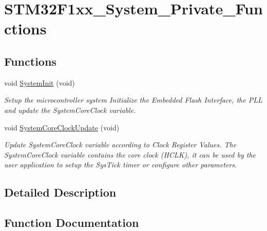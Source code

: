 \hypertarget{group__STM32F1xx__System__Private__Functions}{}\section{S\+T\+M32\+F1xx\+\_\+\+System\+\_\+\+Private\+\_\+\+Functions}
\label{group__STM32F1xx__System__Private__Functions}
\subsection*{Functions}
\begin{DoxyCompactItemize}
\item 
void \mbox{\hyperlink{group__STM32F1xx__System__Private__Functions_ga93f514700ccf00d08dbdcff7f1224eb2}{System\+Init}} (void)
\begin{DoxyCompactList}\small\item\em Setup the microcontroller system Initialize the Embedded Flash Interface, the P\+LL and update the System\+Core\+Clock variable. \end{DoxyCompactList}\item 
void \mbox{\hyperlink{group__STM32F1xx__System__Private__Functions_gae0c36a9591fe6e9c45ecb21a794f0f0f}{System\+Core\+Clock\+Update}} (void)
\begin{DoxyCompactList}\small\item\em Update System\+Core\+Clock variable according to Clock Register Values. The System\+Core\+Clock variable contains the core clock (H\+C\+LK), it can be used by the user application to setup the Sys\+Tick timer or configure other parameters. \end{DoxyCompactList}\end{DoxyCompactItemize}


\subsection{Detailed Description}


\subsection{Function Documentation}
\mbox{\label{group__STM32F1xx__System__Private__Functions_gae0c36a9591fe6e9c45ecb21a794f0f0f}} 
